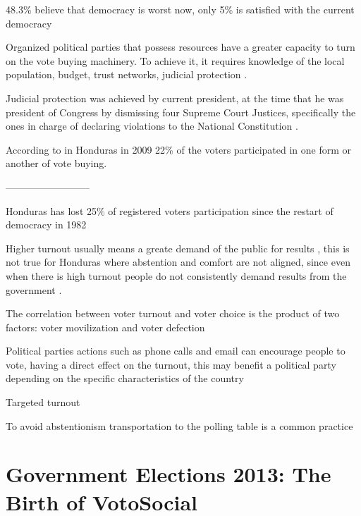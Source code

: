 \documentclass[a4paper,10pt]{article}
\begin{document}
48.3\% believe that democracy is worst now, only 5\% is satisfied with the current democracy \citep{latinbar}

Organized political parties that possess resources have a greater capacity to turn on the vote buying machinery. To achieve it, it requires knowledge of the local population, budget, trust networks, judicial protection \citep{gonza2014}.

Judicial protection was achieved by current president, at the time that he was president of Congress by dismissing four Supreme Court Justices, specifically the ones in charge of declaring violations to the National Constitution \citep{csj2012}.

According to \cite{gonza2014} in Honduras in 2009 22\% of the voters participated in one form or another of vote buying.

--------------------------

Honduras has lost 25\% of registered voters participation since the restart of democracy in 1982 \citep{romero2014}

Higher turnout usually means a greate demand of the public for results \citep{mac2003}, this is not true for Honduras where abstention and comfort are not aligned, since even when there is high turnout people do not consistently demand results from the government \citep{romero2014}.

The correlation between voter turnout and voter choice is the product of two factors: voter movilization and voter defection \citep{osborn2010}

Political parties actions such as phone calls and email can encourage people to vote, having a direct effect on the turnout, this may benefit a political party depending on the specific characteristics of the country \citep{osborn2010}

Targeted turnout

To avoid abstentionism transportation to the polling table is a common practice \citep{romero2014}




\section{Government Elections 2013: The Birth of VotoSocial}
\end{document}
